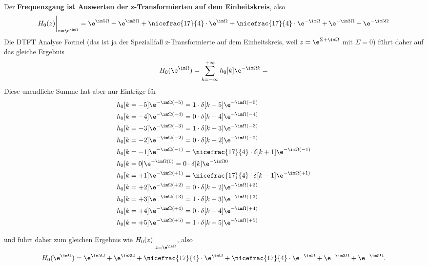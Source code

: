 Der \textbf{Frequenzgang ist Auswerten der z-Transformierten auf dem Einheitskreis}, also
\begin{align}
H_0(z)\bigg|_{z=\e^{\im\Omega}}
=
\e^{\im 5 \Omega} + \e^{\im 3 \Omega} + \nicefrac{17}{4}\cdot \e^{\im \Omega}
 + \nicefrac{17}{4}\cdot \e^{-\im\Omega} + \e^{-\im 3 \Omega} + \e^{-\im 5 \Omega}
\end{align}
%
Die DTFT Analyse Formel (das ist ja der Speziallfall
z-Transformierte auf dem Einheitskreis, weil $z=\e^{\Sigma+\im\Omega}$ mit
$\Sigma=0$) führt daher auf das gleiche Ergebnis
\begin{align}
H_0(\e^{\im\Omega}) = \sum_{k=-\infty}^{+\infty} h_0[k] \e^{-\im\Omega k}=
\end{align}
Diese unendliche Summe hat aber nur Einträge für
\begin{align}
&h_0[k=-5] \e^{-\im\Omega (-5)} =  1\cdot\delta[k+5] \e^{-\im\Omega (-5)}\nonumber\\
&h_0[k=-4] \e^{-\im\Omega (-4)} =  0\cdot\delta[k+4] \e^{-\im\Omega (-4)}\nonumber\\
&h_0[k=-3] \e^{-\im\Omega (-3)} =  1\cdot\delta[k+3] \e^{-\im\Omega (-3)}\nonumber\\
&h_0[k=-2] \e^{-\im\Omega (-2)} =  0\cdot\delta[k+2] \e^{-\im\Omega (-2)}\nonumber\\
&h_0[k=-1] \e^{-\im\Omega (-1)} =  \nicefrac{17}{4}\cdot\delta[k+1] \e^{-\im\Omega (-1)}\nonumber\\
&h_0[k=0] \e^{-\im\Omega (0)} =  0\cdot\delta[k] \e^{-\im\Omega 0}\nonumber\\
&h_0[k=+1] \e^{-\im\Omega (+1)} =  \nicefrac{17}{4}\cdot\delta[k-1] \e^{-\im\Omega (+1)}\nonumber\\
&h_0[k=+2] \e^{-\im\Omega (+2)} =  0\cdot\delta[k-2] \e^{-\im\Omega (+2)}\nonumber\\
&h_0[k=+3] \e^{-\im\Omega (+3)} =  1\cdot\delta[k-3] \e^{-\im\Omega (+3)}\nonumber\\
&h_0[k=+4] \e^{-\im\Omega (+4)} =  0\cdot\delta[k-4] \e^{-\im\Omega (+4)}\nonumber\\
&h_0[k=+5] \e^{-\im\Omega (+5)} =  1\cdot\delta[k-5] \e^{-\im\Omega (+5)}
\end{align}
und führt daher zum gleichen Ergebnis wie $H_0(z)\bigg|_{z=\e^{\im\Omega}}$, also
\begin{align}
H_0(\e^{\im\Omega})
=
\e^{\im 5 \Omega} + \e^{\im 3 \Omega} + \nicefrac{17}{4}\cdot \e^{\im \Omega}
 + \nicefrac{17}{4}\cdot \e^{-\im\Omega} + \e^{-\im 3 \Omega} + \e^{-\im 5 \Omega}.
\end{align}
